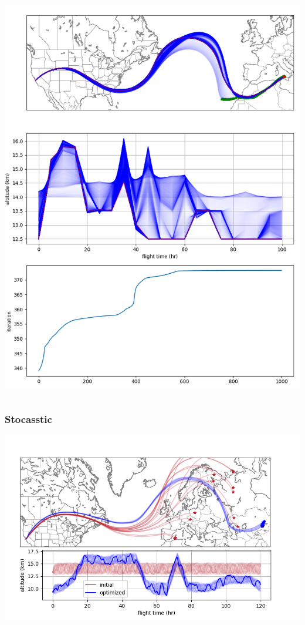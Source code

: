 \documentclass[10pt,mathserif]{beamer}
\begin{document}
\begin{frame}
\begin{columns}
\includegraphics[width=1\linewidth,trim={0 0cm 0 18.3cm},clip]{certaintyeq.png}
\end{columns}
\end{frame}

\begin{frame}
\frametitle{Stocasstic}
\includegraphics[width=1\linewidth,trim={0 0cm 0 0cm},clip]{datasheetfig.png}
\end{frame}
\end{document}
